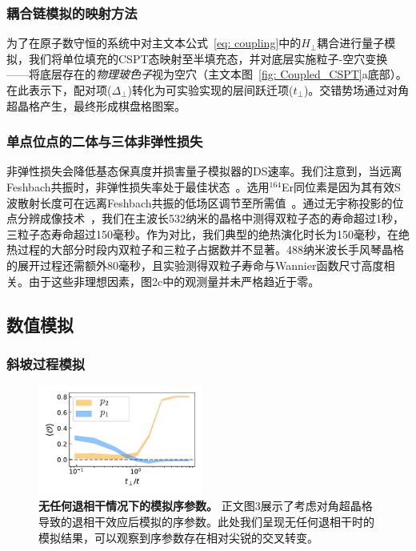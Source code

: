 \documentclass[preprint,superscriptaddress,floatfix, nofootinbib]{revtex4-2}
\begin{document}
\subsubsection*{耦合链模拟的映射方法}

为了在原子数守恒的系统中对主文本公式~\eqref{eq: coupling}中的$H_\perp$耦合进行量子模拟，我们将单位填充的CSPT态映射至半填充态，并对底层实施粒子-空穴变换——将底层存在的\textit{物理玻色子}视为空穴（主文本图~\ref{fig: Coupled_CSPT}a底部）。在此表示下，配对项($\Delta_\perp$)转化为可实验实现的层间跃迁项($t_\perp$)。交错势场通过对角超晶格产生，最终形成棋盘格图案。
\subsubsection*{单点位点的二体与三体非弹性损失}

非弹性损失会降低基态保真度并损害量子模拟器的DS速率。我们注意到，当远离Feshbach共振时，非弹性损失率处于最佳状态~\cite{Chin2010, Frisch2014}。选用$^{164}$Er同位素是因为其有效S波散射长度可在远离Feshbach共振的低场区调节至所需值~\cite{Patscheider2022}。通过无宇称投影的位点分辨成像技术~\cite{Su2024}，我们在主波长532纳米的晶格中测得双粒子态的寿命超过1秒，三粒子态寿命超过150毫秒。作为对比，我们典型的绝热演化时长为150毫秒，在绝热过程的大部分时段内双粒子和三粒子占据数并不显著。488纳米波长手风琴晶格的展开过程还需额外80毫秒，且实验测得双粒子寿命与Wannier函数尺寸高度相关。由于这些非理想因素，图2c中的观测量并未严格趋近于零。
\subsection*{数值模拟}


\subsubsection*{斜坡过程模拟}
\begin{figure}
    \centering
    \includegraphics[width=0.48\textwidth]{figures/Coupled_CSPT_OP_gnd_state_no_decoherence.pdf}
    \caption{\textbf{无任何退相干情况下的模拟序参数。} 正文图3展示了考虑对角超晶格导致的退相干效应后模拟的序参数。此处我们呈现无任何退相干时的模拟结果，可以观察到序参数存在相对尖锐的交叉转变。
    }
    \label{fig: Coupled_CSPT_no_decoherence}
\end{figure}
\end{document}
